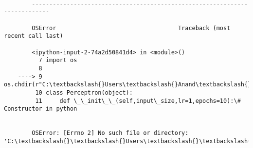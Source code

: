 \documentclass[11pt]{article}
\begin{document}
    \begin{Verbatim}[commandchars=\\\{\}]

        ---------------------------------------------------------------------------

        OSError                                   Traceback (most recent call last)

        <ipython-input-2-74a2d50841d4> in <module>()
          7 import os
          8 
    ----> 9 os.chdir(r"C:\textbackslash{}Users\textbackslash{}Anand\textbackslash{}Desktop\textbackslash{}Nft")
         10 class Perceptron(object):
         11     def \_\_init\_\_(self,input\_size,lr=1,epochs=10):\# Constructor in python


        OSError: [Errno 2] No such file or directory: 'C:\textbackslash{}\textbackslash{}Users\textbackslash{}\textbackslash{}Anand\textbackslash{}\textbackslash{}Desktop\textbackslash{}\textbackslash{}Nft'

    \end{Verbatim}


    
    
    
    
\end{document}
